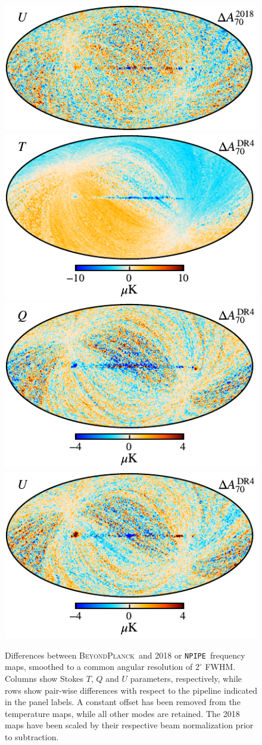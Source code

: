 \documentclass[onecolumn]{aa}
\newcommand{\BP}{\textsc{BeyondPlanck}}
\newcommand{\npipe}[0]{\texttt{NPIPE}}
\begin{document}
\begin{figure}[p]
  \includegraphics[width=0.33\linewidth]{figs/BP_070_diff_dx12_v2_U_DIFF_w8_n1024_c-planck.pdf}\\
  \includegraphics[width=0.33\linewidth]{figs/BP_070_diff_npipe_v2_I_DIFF_w8_n1024_cb_c-planck.pdf}
  \includegraphics[width=0.33\linewidth]{figs/BP_070_diff_npipe_v2_Q_DIFF_w8_n1024_cb_c-planck.pdf}
  \includegraphics[width=0.33\linewidth]{figs/BP_070_diff_npipe_v2_U_DIFF_w8_n1024_cb_c-planck.pdf}\\
  \caption{Differences between \BP\ and 2018 or \npipe\ frequency
    maps, smoothed to a common angular resolution of $2^{\circ}$
    FWHM. Columns show Stokes $T$, $Q$ and $U$ parameters,
    respectively, while rows show pair-wise differences with respect
    to the pipeline indicated in the panel labels. A constant offset
    has been removed from the temperature maps, while all other modes
    are retained. The 2018 maps have been scaled by their respective
    beam normalization prior to subtraction.
  }\label{fig:freqdiff}
\end{figure}
\end{document}
